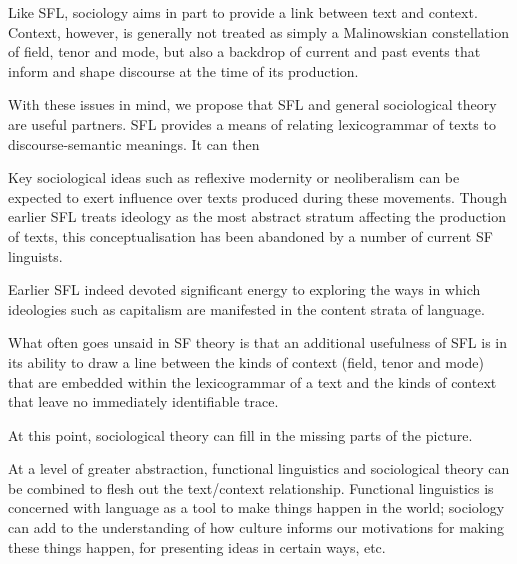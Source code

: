 	Like SFL, sociology aims in part to provide a link between text and context. Context, however, is generally not treated as simply a Malinowskian constellation of field, tenor and mode, but also a backdrop of current and past events that inform and shape discourse at the time of its production.

	With these issues in mind, we propose that SFL and general sociological theory are useful partners. SFL provides a means of relating lexicogrammar of texts to discourse-semantic meanings. It can then 

            Key sociological ideas such as reflexive modernity or neoliberalism can be expected to exert influence over texts produced during these movements. Though earlier SFL treats ideology as the most abstract stratum affecting the production of texts, this conceptualisation has been abandoned by a number of current SF linguists.

            Earlier SFL indeed devoted significant energy to exploring the ways in which ideologies such as capitalism are manifested in the content strata of language.

	What often goes unsaid in SF theory is that an additional usefulness of SFL is in its ability to draw a line between the kinds of context (field, tenor and mode) that are embedded within the lexicogrammar of a text and the kinds of context that leave no immediately identifiable trace.

	At this point, sociological theory can fill in the missing parts of the picture. 

	At a level of greater abstraction, functional linguistics and sociological theory can be combined to flesh out the text\slash context relationship. Functional linguistics is concerned with language as a tool to make things happen in the world; sociology can add to the understanding of how culture informs our motivations for making these things happen, for presenting ideas in certain ways, etc.

%